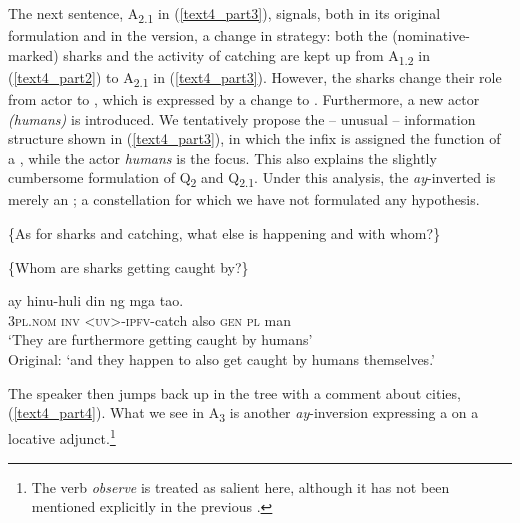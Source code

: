 \documentclass[output=paper,
,modfonts
,nonflat]{langsci/langscibook}
\begin{document}
\noindent The next sentence, A\textsubscript{{2.1}} in (\ref{text4_part3}), signals, both in its original formulation and in the  version, a change in  strategy: both the (nominative-marked) sharks and the activity of catching are kept up from A\textsubscript{{1.2}} in (\ref{text4_part2}) to A\textsubscript{{2.1}} in (\ref{text4_part3}). However, the sharks change their role from actor to , which is expressed by a  change to . Furthermore, a new actor \textit{(humans)} is introduced. We tentatively propose the -- unusual -- information structure shown in (\ref{text4_part3}), in which the  infix is assigned the function of a , while the actor \textit{humans} is the focus. This also explains the slightly cumbersome formulation of Q\textsubscript{2} and Q\textsubscript{{2.1}}. Under this analysis, the \textit{ay}-inverted  is merely an ; a constellation for which we have not formulated any hypothesis. 

\begin{exe}
\ex\label{text4_part3}
\begin{xlist}[{>}>{>}> Q\textsubscript{2}:]
 \{As for sharks and catching, what else is happening and with whom?\}
\end{xlist}
\begin{xlist}
 \{Whom are sharks getting caught by?\}
\end{xlist}
\begin{xlist}[{>}>{>}>{>}> A\textsubscript{{2.1}}:]
 ay {h{\ob}{\USSmaller}in{\USGreater}{\cb}\ctopic u-huli} din {{\ob}ng} mga {tao{\cb}\focus{\cb}\sq}.\\
\textsc{\void{[[}3pl.nom} \textsc{inv} \textsc{<uv>-ipfv}-catch also \textsc{\void{[}gen} \textsc{pl} man\\
\glt `They are furthermore getting caught  by humans'\\
Original: `and they happen to also get caught  by humans themselves.'
\end{xlist}
\end{exe}

\noindent The speaker then jumps back up in the tree with a comment about cities, (\ref{text4_part4}). What we see in A\textsubscript{{3}} is another \textit{ay}-inversion expressing a  on a locative adjunct.\footnote{The verb \textit{observe} is treated as salient here, although it has not been mentioned explicitly in the previous .}
\end{document}
